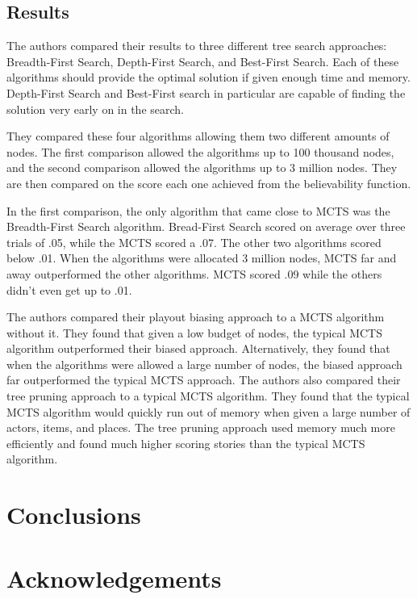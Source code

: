 \documentclass{sig-alternate}
\begin{document}
\subsection{Results}
The authors compared their results to three different tree search approaches: Breadth-First Search, Depth-First Search, and Best-First Search\cite{Narrative}. Each of these algorithms should provide the optimal solution if given enough time and memory. Depth-First Search and Best-First search in particular are capable of finding the solution very early on in the search.

They compared these four algorithms allowing them two different amounts of nodes. The first comparison allowed the algorithms up to 100 thousand nodes, and the second comparison allowed the algorithms up to 3 million nodes. They are then compared on the score each one achieved from the believability function.

In the first comparison, the only algorithm that came close to MCTS was the Breadth-First Search algorithm. Bread-First Search scored on average over three trials of .05, while the MCTS scored a .07. The other two algorithms scored below .01. When the algorithms were allocated 3 million nodes, MCTS far and away outperformed the other algorithms. MCTS scored .09 while the others didn't even get up to .01.

The authors compared their playout biasing approach to a MCTS algorithm without it. They found that given a low budget of nodes, the typical MCTS algorithm outperformed their biased approach. Alternatively, they found that when the algorithms were allowed a large number of nodes, the biased approach far outperformed the typical MCTS approach. The authors also compared their tree pruning approach to a typical MCTS algorithm. They found that the typical MCTS algorithm would quickly run out of memory when given a large number of actors, items, and places. The tree pruning approach used memory much more efficiently and found much higher scoring stories than the typical MCTS algorithm.

\section{Conclusions}

\section{Acknowledgements}


  
\end{document}
